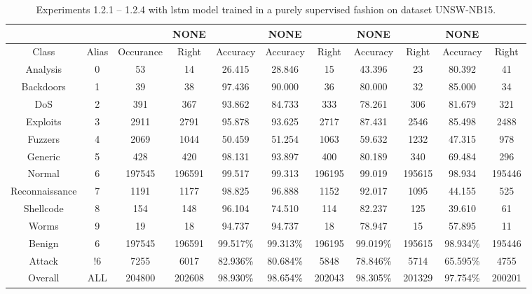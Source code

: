 \begin{table}[htb]
    \centering
    \caption{Experiments 1.2.1 – 1.2.4 with \gls{lstm} model trained in a purely supervised fashion on dataset UNSW-NB15.}
    \label{table:results:lstm:flows15_supervised}
    \begin{tabular}{@{}ccccccccccc@{}}
        \toprule
         &  &  & NONE &  & NONE &  & NONE &  & NONE &  \\
        \midrule
        Class &  Alias &  Occurance &  Right &  Accuracy &  Accuracy &  Right &  Accuracy &  Right &  Accuracy &  Right \\
        Analysis &  0 &  53 &  14 &  26.415 &  28.846 &  15 &  43.396 &  23 &  80.392 &  41 \\
        Backdoors &  1 &  39 &  38 &  97.436 &  90.000 &  36 &  80.000 &  32 &  85.000 &  34 \\
        DoS &  2 &  391 &  367 &  93.862 &  84.733 &  333 &  78.261 &  306 &  81.679 &  321 \\
        Exploits &  3 &  2911 &  2791 &  95.878 &  93.625 &  2717 &  87.431 &  2546 &  85.498 &  2488 \\
        Fuzzers &  4 &  2069 &  1044 &  50.459 &  51.254 &  1063 &  59.632 &  1232 &  47.315 &  978 \\
        Generic &  5 &  428 &  420 &  98.131 &  93.897 &  400 &  80.189 &  340 &  69.484 &  296 \\
        Normal &  6 &  197545 &  196591 &  99.517 &  99.313 &  196195 &  99.019 &  195615 &  98.934 &  195446 \\
        Reconnaissance &  7 &  1191 &  1177 &  98.825 &  96.888 &  1152 &  92.017 &  1095 &  44.155 &  525 \\
        Shellcode &  8 &  154 &  148 &  96.104 &  74.510 &  114 &  82.237 &  125 &  39.610 &  61 \\
        Worms &  9 &  19 &  18 &  94.737 &  94.737 &  18 &  78.947 &  15 &  57.895 &  11 \\
        Benign &  6 &  197545 &  196591 &  99.517\% &  99.313\% &  196195 &  99.019\% &  195615 &  98.934\% &  195446 \\
        Attack &  !6 &  7255 &  6017 &  82.936\% &  80.684\% &  5848 &  78.846\% &  5714 &  65.595\% &  4755 \\
        Overall &  ALL &  204800 &  202608 &  98.930\% &  98.654\% &  202043 &  98.305\% &  201329 &  97.754\% &  200201 \\
        \bottomrule
    \end{tabular}
\end{table}